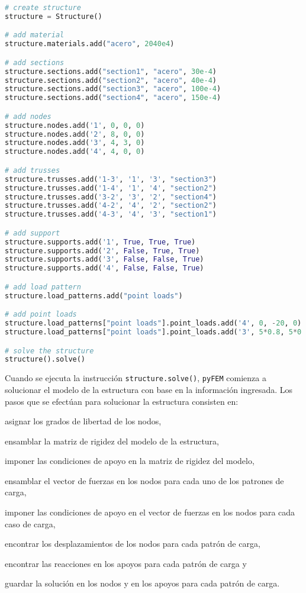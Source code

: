 \begin{lstlisting}[language=Python,caption=Ingreso de los datos del modelo de la estructura a \textit{pyFEM}.,label=alg:cercha_plana, frame=single]
# create structure
structure = Structure()

# add material
structure.materials.add("acero", 2040e4)

# add sections
structure.sections.add("section1", "acero", 30e-4)
structure.sections.add("section2", "acero", 40e-4)
structure.sections.add("section3", "acero", 100e-4)
structure.sections.add("section4", "acero", 150e-4)

# add nodes
structure.nodes.add('1', 0, 0, 0)
structure.nodes.add('2', 8, 0, 0)
structure.nodes.add('3', 4, 3, 0)
structure.nodes.add('4', 4, 0, 0)

# add trusses
structure.trusses.add('1-3', '1', '3', "section3")
structure.trusses.add('1-4', '1', '4', "section2")
structure.trusses.add('3-2', '3', '2', "section4")
structure.trusses.add('4-2', '4', '2', "section2")
structure.trusses.add('4-3', '4', '3', "section1")

# add support
structure.supports.add('1', True, True, True)
structure.supports.add('2', False, True, True)
structure.supports.add('3', False, False, True)
structure.supports.add('4', False, False, True)

# add load pattern
structure.load_patterns.add("point loads")

# add point loads
structure.load_patterns["point loads"].point_loads.add('4', 0, -20, 0)
structure.load_patterns["point loads"].point_loads.add('3', 5*0.8, 5*0.6, 0)

# solve the structure
structure().solve()
\end{lstlisting}

Cuando se ejecuta la instrucción \texttt{structure.solve()}, \texttt{pyFEM} comienza a solucionar el modelo de la estructura con base en la información ingresada. Los pasos que se efectúan para solucionar la estructura consisten en: 
\begin{inparaenum}[$ (1) $]
    \item asignar los grados de libertad de los nodos, 
    \item ensamblar la matriz de rigidez del modelo de la estructura, 
    \item imponer las condiciones de apoyo en la matriz de rigidez del modelo, 
    \item ensamblar el vector de fuerzas en los nodos para cada uno de los patrones de carga, 
    \item imponer las condiciones de apoyo en el vector de fuerzas en los nodos para cada caso de carga, 
    \item encontrar los desplazamientos de los nodos para cada patrón de carga, 
    \item encontrar las reacciones en los apoyos para cada patrón de carga y
    \item guardar la solución en los nodos y en los apoyos para cada patrón de carga.
\end{inparaenum} \\

